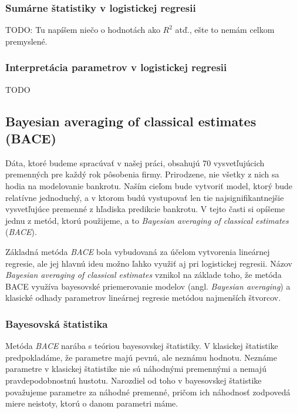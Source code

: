 \subsubsection{Sumárne štatistiky v logistickej regresii}

TODO: Tu napíšem niečo o hodnotách ako \(R^2\) atď., ešte to nemám celkom premyslené.

\subsubsection{Interpretácia parametrov v logistickej regresii}

TODO

\subsection{Bayesian averaging of classical estimates (BACE)}

Dáta, ktoré budeme spracúvať v našej práci, obsahujú 70 vysvetľujúcich premenných pre každý rok pôsobenia firmy.
Prirodzene, nie všetky z nich sa hodia na modelovanie bankrotu.
Naším cieľom bude vytvoriť model, ktorý bude relatívne jednoduchý, a v ktorom budú vystupovať len tie najsignifikantnejšie vysvetľujúce premenné z hľadiska predikcie bankrotu.
V tejto časti si opíšeme jednu z metód, ktorú použijeme, a to \emph{Bayesian averaging of classical estimates} (\emph{BACE}).

Základná metóda \emph{BACE} bola vybudovaná za účelom vytvorenia lineárnej regresie, ale jej hlavnú ideu možno ľahko využiť aj pri logistickej regresii.
Názov \emph{Bayesian averaging of classical estimates} vznikol na základe toho, že metóda BACE využíva bayesovské priemerovanie modelov (angl. \emph{Bayesian averaging}) a klasické odhady parametrov lineárnej regresie metódou najmenších štvorcov.

\subsubsection{Bayesovská štatistika}

Metóda \emph{BACE} narába s teóriou bayesovskej štatistiky.
V klasickej štatistike predpokladáme, že parametre majú pevnú, ale neznámu hodnotu.
Neznáme parametre v klasickej štatistike nie sú náhodnými premennými a nemajú pravdepodobnostnú hustotu.
Narozdiel od toho v bayesovskej štatistike považujeme parametre za náhodné premenné, pričom ich náhodnosť zodpovedá miere neistoty, ktorú o danom parametri máme.

